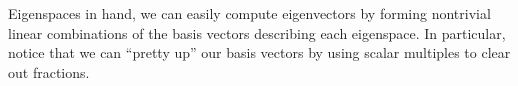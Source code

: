 \documentclass{ximera}
\begin{document}
\begin{example}
  Eigenspaces in hand, we can easily compute eigenvectors by forming
  nontrivial linear combinations of the basis vectors describing each
  eigenspace.  In particular, notice that we can ``pretty up'' our
  basis vectors by using scalar multiples to clear out fractions.

\end{example}
\end{document}

